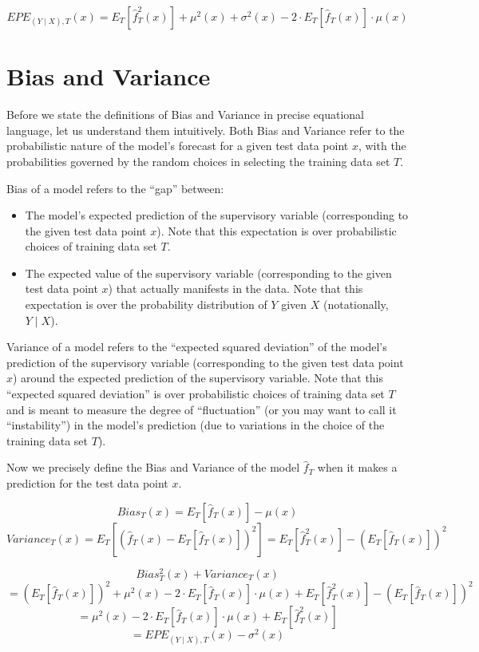 \documentclass[11pt]{article}   	%
\begin{document}
$$EPE_{(Y \mid X), T}(x) = E_T [\hat{f}^2_T(x)] + \mu^2(x) + \sigma^2(x) - 2 \cdot E_T [\hat{f}_T(x)] \cdot \mu(x)$$

\section{Bias and Variance}

Before we state the definitions of Bias and Variance in precise equational language, let us understand them intuitively. Both Bias and Variance refer to the probabilistic nature of the model's forecast for a given test data point $x$, with the probabilities governed by the random choices in selecting the training data set $T$.

Bias of a model refers to the ``gap'' between:
\begin{itemize}
\item The model's expected prediction of the supervisory variable (corresponding to the given test data point $x$). Note that this expectation is over probabilistic choices of training data set $T$.
\item The expected value of the supervisory variable (corresponding to the given test data point $x$) that actually manifests in the data. Note that this expectation is over the probability distribution of $Y$ given $X$ (notationally, $Y \mid X$).
\end{itemize}

Variance of a model refers to the ``expected squared deviation'' of the model's prediction of the supervisory variable (corresponding to the given test data point $x$) around the expected prediction of the supervisory variable. Note that this ``expected squared deviation'' is over probabilistic choices of training data set $T$ and is meant to measure the degree of ``fluctuation'' (or you may want to call it ``instability'') in the model's prediction (due to variations in the choice of the training data set $T$).

Now we precisely define the Bias and Variance of the model $\hat{f}_T$ when it makes a prediction for the test data point $x$.

$$Bias_T(x) = E_T [\hat{f}_T(x)] - \mu(x)$$
$$Variance_T(x) = E_T[(\hat{f}_T(x) - E_T[\hat{f}_T(x)])^2] = E_T[\hat{f}^2_T(x)] - (E_T[\hat{f}_T(x)])^2$$

$$Bias^2_T(x) + Variance_T(x) $$
$$ = (E_T [\hat{f}_T(x)])^2 + \mu^2(x) - 2 \cdot E_T [\hat{f}_T(x)] \cdot \mu(x) + E_T[\hat{f}^2_T(x)] - (E_T[\hat{f}_T(x)])^2$$
$$ = \mu^2(x) - 2 \cdot E_T [\hat{f}_T(x)] \cdot \mu(x) + E_T[\hat{f}^2_T(x)] $$
$$ = EPE_{(Y \mid X), T}(x)  - \sigma^2(x)$$
\end{document}
